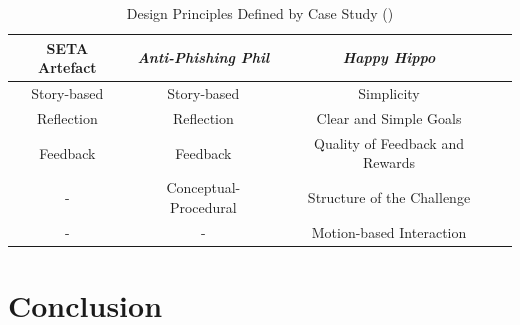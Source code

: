\begin{table}[H]
\caption{Design Principles Defined by Case Study (\cite{Dincelli2020,Sheng2007,allers2021children})}
\begin{center}
\begin{tabular}{|c|c|c|c|}
\hline

\textbf{SETA Artefact} & \textbf{\textit{Anti-Phishing Phil}}& \textbf{\textit{Happy Hippo}} \\
\hline
Story-based	& Story-based 			& Simplicity  \\
Reflection	& Reflection			& Clear and Simple Goals  \\
Feedback	& Feedback 				& Quality of Feedback and Rewards  \\
	-		& Conceptual-Procedural	& Structure of the Challenge  \\
	-		& 		-				& Motion-based Interaction  \\
\hline

\end{tabular}
\label{tab4.1}
\end{center}
\end{table}

\noindent 



\section{Conclusion}
